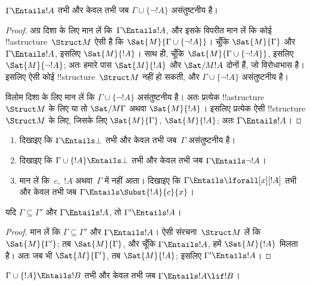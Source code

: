 \documentclass[../../../include/open-logic-section]{subfiles}
\begin{document}
\begin{prop}
$\Gamma \Entails !A$ तभी और केवल तभी जब $\Gamma \cup \{\lnot !A\}$
असंतुष्टनीय है।
\end{prop}

\begin{proof}
अग्र दिशा के लिए मान लें कि~$\Gamma \Entails !A$, और इसके विपरीत मान लें
कि कोई !!a{structure}~$\Struct M$ ऐसी है कि
$\Sat{M}{\Gamma
  \cup \{ \lnot !A \}}$। चूँकि $\Sat{M}{\Gamma}$ और $\Gamma \Entails
!A$, इसलिए $\Sat{M}{!A}$। साथ ही, चूँकि
$\Sat{M}{\Gamma\cup \{ \lnot !A \}}$, इसलिए $\Sat{M}{\lnot !A}$;
अतः हमारे पास $\Sat{M}{!A}$ और $\Sat/{M}{!A}$ दोनों हैं, जो विरोधाभास है।
इसलिए ऐसी कोई !!{structure}~$\Struct M$ नहीं हो सकती, और
$\Gamma \cup \{ \lnot !A \}$ असंतुष्टनीय है।

विलोम दिशा के लिए मान लें कि $\Gamma \cup \{ \lnot !A \}$
असंतुष्टनीय है। अतः प्रत्येक !!a{structure}~$\Struct M$ के लिए या तो
$\Sat/{M}{\Gamma}$ अथवा $\Sat{M}{!A}$। इसलिए प्रत्येक ऐसी !!{structure}
$\Struct M$ के लिए, जिसके लिए $\Sat{M}{\Gamma}$, $\Sat{M}{!A}$; अतः
$\Gamma \Entails
!A$।
\end{proof}

\begin{prob}
\begin{enumerate}
\item दिखाइए कि $\Gamma \Entails \bot$ तभी और केवल तभी जब~$\Gamma$
  असंतुष्टनीय है।
\item दिखाइए कि $\Gamma \cup \{!A\} \Entails \bot$ तभी और केवल तभी जब
  $\Gamma \Entails \lnot !A$।
\item मान लें कि~$c$,~$!A$ अथवा~$\Gamma$ में नहीं आता। दिखाइए कि
  $\Gamma \Entails \lforall[x][!A]$ तभी और केवल तभी जब $\Gamma \Entails
  \Subst{!A}{c}{x}$।
\end{enumerate}
\end{prob}

\begin{prop}
यदि $\Gamma \subseteq \Gamma'$ और $\Gamma \Entails !A$, तो
$\Gamma'
\Entails !A$।
\end{prop}

\begin{proof}
मान लें कि $\Gamma \subseteq \Gamma'$ और $\Gamma \Entails !A$। ऐसी
संरचना~$\Struct M$ लें कि $\Sat{M}{\Gamma'}$; तब $\Sat{M}{\Gamma}$, और
चूँकि $\Gamma \Entails !A$, हमें $\Sat{M}{!A}$ मिलता है। अतः जब भी
$\Sat{M}{\Gamma'}$, तब $\Sat{M}{!A}$; इसलिए $\Gamma' \Entails !A$।
\end{proof}


\begin{thm}
$\Gamma \cup \{!A\} \Entails !B$ तभी और केवल तभी जब
$\Gamma \Entails !A \lif !B$।
\end{thm}
\end{document}
